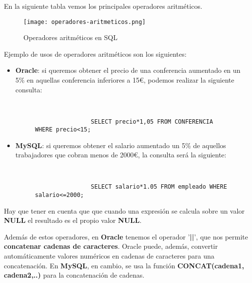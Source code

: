 En la siguiente tabla vemos los principales operadores aritméticos.

\begin{figure}[H]
    \centering
    \texttt{[image: operadores-aritmeticos.png]}
    \caption{Operadores aritméticos en SQL}
\end{figure}

Ejemplo de usos de operadores aritméticos son los siguientes:

\begin{itemize}
    \item \textbf{Oracle}: si queremos obtener el precio de una conferencia aumentado en un 5\% en aquellas conferencia inferiores a 15€, podemos realizar la siguiente consulta:

    \begin{figure}[h]
        \begin{tcolorbox}[sharp corners, colback=yellow!30, colframe=white!20]
            \scriptsize
            \begin{verbatim}


                SELECT precio*1,05 FROM CONFERENCIA WHERE precio<15;
            \end{verbatim}
        \end{tcolorbox}
    \end{figure}

    \item \textbf{MySQL}: si queremos obtener el salario aumentado un 5\% de aquellos trabajadores que cobran menos de 2000€, la consulta será la siguiente:

    \begin{figure}[h]
        \begin{tcolorbox}[sharp corners, colback=yellow!30, colframe=white!20]
            \scriptsize
            \begin{verbatim}


                SELECT salario*1.05 FROM empleado WHERE salario<=2000;
            \end{verbatim}
        \end{tcolorbox}
    \end{figure}
\end{itemize}

Hay que tener en cuenta que que cuando una expresión se calcula sobre un valor \textbf{NULL} el resultado es el propio valor \textbf{NULL}.

Además de estos operadores, en \textbf{Oracle} tenemos el operador '\textbf{||}', que nos permite \textbf{concatenar cadenas de caracteres}. Oracle puede, además, convertir automáticamente valores numéricos en cadenas de caracteres para una concatenación. En \textbf{MySQL}, en cambio, se usa la función \textbf{CONCAT(cadena1, cadena2,..)} para la concatenación de cadenas.

